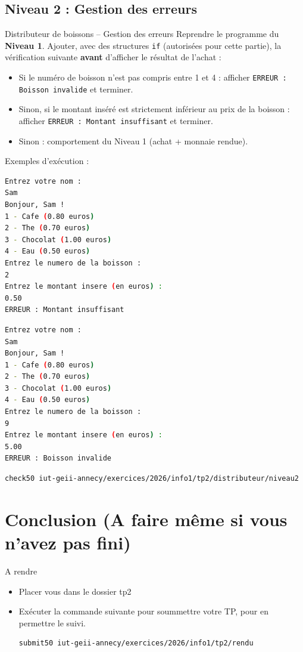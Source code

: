\subsection{Niveau 2 : Gestion des erreurs}

\begin{UPSTIManipulation}{Distributeur de boissons -- Gestion des erreurs}
	Reprendre le programme du \textbf{Niveau 1}. Ajouter, avec des structures \texttt{if} (autorisées pour cette partie), la vérification suivante \textbf{avant} d'afficher le résultat de l'achat :
	\begin{itemize}
		\item Si le numéro de boisson n'est pas compris entre 1 et 4 : afficher \texttt{ERREUR : Boisson invalide} et terminer.
		\item Sinon, si le montant inséré est strictement inférieur au prix de la boisson : afficher \texttt{ERREUR : Montant insuffisant} et terminer.
		\item Sinon : comportement du Niveau 1 (achat + monnaie rendue).
	\end{itemize}

	Exemples d'exécution :
	\begin{lstlisting}[language=bash,style=console]
Entrez votre nom :
Sam
Bonjour, Sam !
1 - Cafe (0.80 euros)
2 - The (0.70 euros)
3 - Chocolat (1.00 euros)
4 - Eau (0.50 euros)
Entrez le numero de la boisson :
2
Entrez le montant insere (en euros) :
0.50
ERREUR : Montant insuffisant
	\end{lstlisting}
	\begin{lstlisting}[language=bash,style=console]
Entrez votre nom :
Sam
Bonjour, Sam !
1 - Cafe (0.80 euros)
2 - The (0.70 euros)
3 - Chocolat (1.00 euros)
4 - Eau (0.50 euros)
Entrez le numero de la boisson :
9
Entrez le montant insere (en euros) :
5.00
ERREUR : Boisson invalide
	\end{lstlisting}

	\tcblower
	\begin{lstlisting}[language=bash]
check50 iut-geii-annecy/exercices/2026/info1/tp2/distributeur/niveau2
	\end{lstlisting}
\end{UPSTIManipulation}

\section{Conclusion (A faire même si vous n'avez pas fini)}

\begin{UPSTIManipulation}{A rendre}
	\begin{itemize}
		\item[$\Box$] Placer vous dans le dossier tp2
		\item[$\Box$] Exécuter la commande suivante pour soummettre votre TP, pour en permettre le suivi.
		      \begin{lstlisting}[language=bash,style=console]
submit50 iut-geii-annecy/exercices/2026/info1/tp2/rendu
\end{lstlisting}
	\end{itemize}
\end{UPSTIManipulation}


